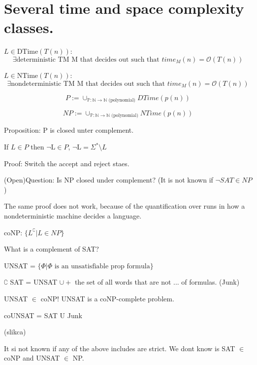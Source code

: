 \documentclass[a4paper,12pt]{article}
\theoremstyle{definition}
\theoremstyle{remark}
\newcommand{\N}{\mathbb{N}}
\newcommand{\Pp}{\mathbb{P}}
\begin{document}
\newpage
\section{Several time and space complexity classes.}

$L \in \text{DTime}(T(n))$:
\begin{equation*}
    \exists \text{deterministic TM M that decides out such that } time_M(n) = \mathscr{O}(T(n))
\end{equation*}

$L \in \text{NTime}(T(n))$: 
\begin{equation*}
    \exists \text{nondeterministic TM M that decides out such that } time_M(n) = \mathscr{O}(T(n))
\end{equation*}

\begin{equation*}
    P := \cup_{\Pp: \N \to \N \text{ (polynomial)}} DTime(p(n))
\end{equation*}


\begin{equation*}
    NP := \cup_{\Pp: \N \to \N \text{ (polynomial)}} NTime(p(n))
\end{equation*}

Proposition: P is closed unter complement.

If $L \in P$ then $\neg \text{L} \in P$, $\neg \text{L} = \Sigma^* \setminus L$

Proof: Switch the accept and reject staes.

(Open)Question: Is NP closed under complement? (It is not known if $\neg SAT \in NP$)

The same proof does not work, because of the quantification over runs in how a nondeterministic machine decides a language.

coNP: $\{ L^{\complement} | L \in NP\}$

What is a complement of SAT?


UNSAT = $\{\Phi | \Phi \text{ is an unsatisfiable prop formula}\}$

$\complement$ SAT = UNSAT $\cup +$ the set of all words that are not ... of formulas. (Junk)

UNSAT $\in$ coNP! UNSAT is a coNP-complete problem.

coUNSAT = SAT U Junk

(slikca)

It si not known if any of the above includes are strict. We dont know is SAT $\in$ coNP and UNSAT $\in$ NP.
\end{document}
